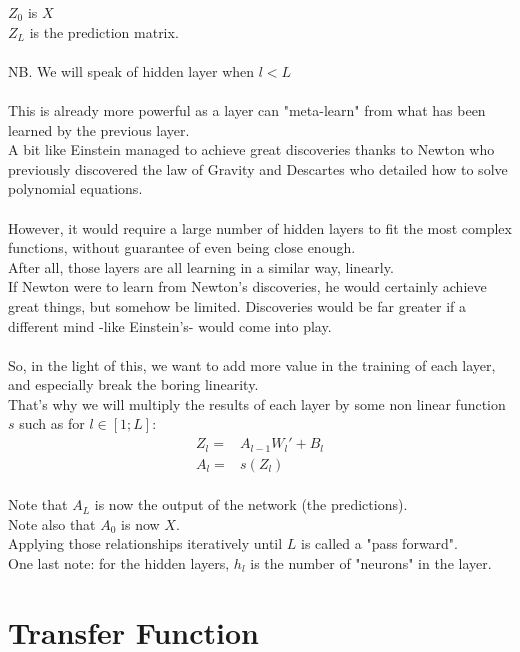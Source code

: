 \documentclass[]{article}
\begin{document}
$Z_0$ is $X$\\
$Z_L$ is the prediction matrix.\\
\\
NB. We will speak of hidden layer when $l<L$\\
\\
This is already more powerful as a layer can "meta-learn" from what has been learned by the previous layer.\\
A bit like Einstein managed to achieve great discoveries thanks to Newton who previously discovered the law of Gravity and Descartes who detailed how to solve polynomial equations.\\
\\
However, it would require a large number of hidden layers to fit the most complex functions, without guarantee of even being close enough.\\
After all, those layers are all learning in a similar way, linearly.\\
If Newton were to learn from Newton's discoveries, he would certainly achieve great things, but somehow be limited. Discoveries would be far greater if a different mind -like Einstein's- would come into play.\\
\\
So, in the light of this, we want to add more value in the training of each layer, and especially break the boring linearity.\\
That's why we will multiply the results of each layer by some non linear function $s$ such as for $l \in [1;L]$:\\

\begin{align}
Z_l=&A_{l-1}W_{l}'+B_{l} \label{eq:fwdZ} \\ 
A_l=&s(Z_{l}) \label{eq:fwdA}
\end{align}
\\
Note that $A_L$ is now the output of the network (the predictions).\\
Note also that $A_0$ is now $X$.\\
Applying those relationships iteratively until $L$ is called a "pass forward".\\
One last note: for the hidden layers, $h_l$ is the number of "neurons" in the layer.\\

\section{Transfer Function}
\end{document}
